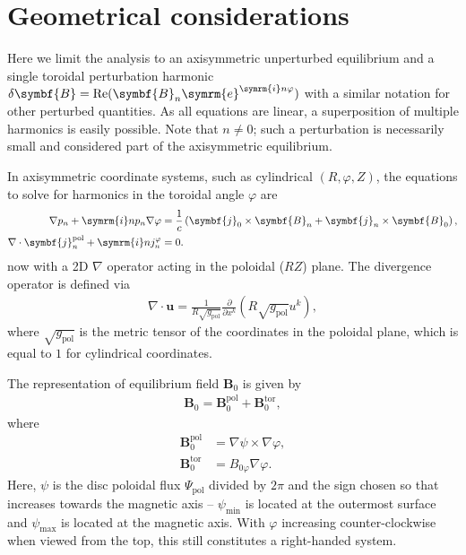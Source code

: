 \documentclass[a4paper, 10pt, english]{article}
\let\temp\varrho
\let\varrho\rho
\let\rho\temp
\let\temp\vartheta
\let\vartheta\theta
\let\theta\temp
\let\temp\varphi
\let\varphi\phi
\let\phi\temp
\let\vec\symbf
\newcommand*\e{\ensuremath{\symrm{e}}}  %
\newcommand*\im{\ensuremath{\symrm{i}}}  %
\newcommand*\pd[2][]{\ensuremath{\frac{\partial #1}{\partial #2}}}  %
\newcommand*\pol{\ensuremath{\textrm{pol}}}  %
\newcommand*\tor{\ensuremath{\textrm{tor}}}  %
\DeclareMathOperator\Real{Re}
\begin{document}
\section{Geometrical considerations}

Here we limit the analysis to an axisymmetric unperturbed equilibrium and a single toroidal perturbation harmonic $\delta \vec{B} = \Real (\vec{B}_{n} \e^{\im n \phi})$ with a similar notation for other perturbed quantities. As all equations are linear, a superposition of multiple harmonics is easily possible. Note that $n \neq 0$; such a perturbation is necessarily small and considered part of the axisymmetric equilibrium.

In axisymmetric coordinate systems, such as cylindrical $(R, \phi, Z)$, the equations to solve for harmonics in the toroidal angle $\phi$ are
\begin{align}
  \nabla p_{n} + \im n p_{n} \nabla \phi &= \frac{1}{c} \left( \vec{j}_{0} \times \vec{B}_{n} + \vec{j}_{n} \times \vec{B}_{0} \right), \label{eq:mhd-phi} \\
  \nabla \cdot \vec{j}_{n}^{\pol}+ \im n j_{n}^{\phi} &= 0. \label{eq:divfree-phi}
\end{align}
now with a 2D $\nabla$ operator acting in the poloidal ($RZ$) plane. The divergence operator is defined via
\begin{gather*}
  \nabla \cdot \vec{u} = \frac{1}{R \sqrt{g_{\pol}}} \pd{x^{k}} (R \sqrt{g_{\pol}} u^{k}),
\end{gather*}
where $\sqrt{g_{\pol}}$ is the metric tensor of the coordinates in the poloidal plane, which is equal to $1$ for cylindrical coordinates.

The representation of equilibrium field $\vec{B}_{0}$ is given by
\begin{gather}
  \vec{B}_{0} = \vec{B}_{0}^{\pol} + \vec{B}_{0}^{\tor},
\end{gather}
where 
\begin{align}
  \vec{B}_{0}^{\pol} &= \nabla \psi \times \nabla \phi, \\
  \vec{B}_{0}^{\tor} &= B_{0 \phi} \nabla \phi.
\end{align}
Here, $\psi$ is the disc poloidal flux $\Psi_{\pol}$ divided by $2 \pi$ and the sign chosen so that increases towards the magnetic axis -- $\psi_{\text{min}}$ is located at the outermost surface and $\psi_{\text{max}}$ is located at the magnetic axis. With $\phi$ increasing counter-clockwise when viewed from the top, this still constitutes a right-handed system.
\end{document}
